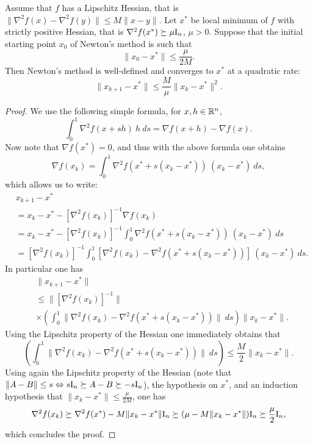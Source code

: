 \begin{theorem}
\label{th:NM}
Assume that $f$ has a Lipschitz Hessian, that is $\| \nabla^2 f(x) - \nabla^2 f(y) \| \leq M \|x - y\|$. Let $x^*$ be local minimum of $f$ with strictly positive Hessian, that is $\nabla^2 f(x^*) \succeq \mu \mathrm{I}_n$, $\mu > 0$. Suppose that the initial starting point $x_0$ of Newton's method is such that
$$\|x_0 - x^*\| \leq \frac{\mu}{2 M} .$$
Then Newton's method is well-defined and converges to $x^*$ at a quadratic rate:
$$\|x_{k+1} - x^*\| \leq \frac{M}{\mu} \|x_k - x^*\|^2.$$
\end{theorem}

\begin{proof}
We use the following simple formula, for $x, h \in \mathbb{R}^n$,
$$\int_0^1 \nabla^2 f(x + s h) \ h \ ds = \nabla f(x+h) - \nabla f(x) .$$
Now note that $\nabla f(x^*) = 0$, and thus with the above formula one obtains
$$\nabla f(x_k) = \int_0^1 \nabla^2 f(x^* + s (x_k - x^*)) \ (x_k - x^*) \ ds ,$$
which allows us to write:
\begin{align*}
& x_{k+1} - x^* \\
& = x_k - x^* - [\nabla^2 f(x_k)]^{-1} \nabla f(x_k) \\
& = x_k - x^* - [\nabla^2 f(x_k)]^{-1} \int_0^1 \nabla^2 f(x^* + s (x_k - x^*)) \ (x_k - x^*) \ ds \\
& = [\nabla^2 f(x_k)]^{-1} \int_0^1 [\nabla^2 f (x_k) - \nabla^2 f(x^* + s (x_k - x^*)) ] \ (x_k - x^*) \ ds .
\end{align*}
In particular one has
\begin{align*}
& \|x_{k+1} - x^*\| \\
& \leq \|[\nabla^2 f(x_k)]^{-1}\| \\
& \times \left( \int_0^1 \| \nabla^2 f (x_k) - \nabla^2 f(x^* + s (x_k - x^*)) \| \ ds \right) \|x_k - x^* \|.
\end{align*}
Using the Lipschitz property of the Hessian one immediately obtains that 
$$\left( \int_0^1 \| \nabla^2 f (x_k) - \nabla^2 f(x^* + s (x_k - x^*)) \| \ ds \right) \leq \frac{M}{2} \|x_k - x^*\| .$$
Using again the Lipschitz property of the Hessian (note that $\|A - B\| \leq s \Leftrightarrow s \mathrm{I}_n \succeq A - B \succeq - s \mathrm{I}_n$), the hypothesis on $x^*$, and an induction hypothesis that $\|x_k - x^*\| \leq \frac{\mu}{2M}$, one has
$$\nabla^2 f(x_k) \succeq \nabla^2 f(x^*) - M \|x_k - x^*\| \mathrm{I}_n \succeq (\mu - M \|x_k - x^*\|) \mathrm{I}_n \succeq \frac{\mu}{2} \mathrm{I}_n ,$$
which concludes the proof.
\end{proof}

